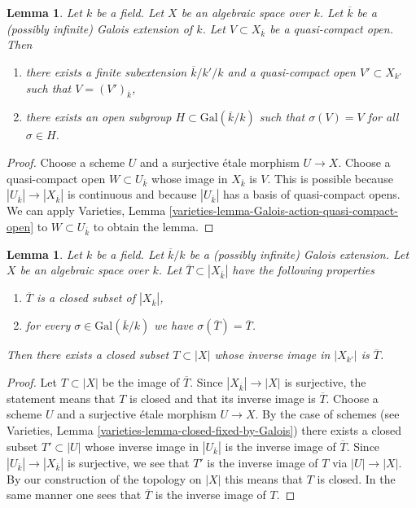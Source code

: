 \documentclass{stacks-project}
\theoremstyle{plain}
\newtheorem{lemma}[subsection]{Lemma}
\theoremstyle{definition}
\theoremstyle{remark}
\numberwithin{equation}{subsection}
\begin{document}
\begin{lemma}
\label{lemma-Galois-action-quasi-compact-open}
Let $k$ be a field. Let $X$ be an algebraic space over $k$.
Let $\overline{k}$ be a (possibly infinite) Galois extension of $k$.
Let $V \subset X_{\overline{k}}$ be a quasi-compact open.
Then
\begin{enumerate}
\item there exists a finite subextension $\overline{k}/k'/k$
and a quasi-compact open $V' \subset X_{k'}$ such that
$V = (V')_{\overline{k}}$,
\item there exists an open subgroup $H \subset \text{Gal}(\overline{k}/k)$
such that $\sigma(V) = V$ for all $\sigma \in H$.
\end{enumerate}
\end{lemma}

\begin{proof}
Choose a scheme $U$ and a surjective \'etale morphism $U \to X$.
Choose a quasi-compact open $W \subset U_{\overline{k}}$ whose
image in $X_{\overline{k}}$ is $V$. This is possible because
$|U_{\overline{k}}| \to |X_{\overline{k}}|$ is continuous and because
$|U_{\overline{k}}|$ has a basis of quasi-compact opens. We can apply
Varieties, Lemma
\ref{varieties-lemma-Galois-action-quasi-compact-open}
to $W \subset U_{\overline{k}}$ to obtain the lemma.
\end{proof}

\begin{lemma}
\label{lemma-closed-fixed-by-Galois}
Let $k$ be a field. Let $\overline{k}/k$ be a (possibly infinite)
Galois extension. Let $X$ be an algebraic space over $k$. Let
$\overline{T} \subset |X_{\overline{k}}|$ have the following properties
\begin{enumerate}
\item $\overline{T}$ is a closed subset of $|X_{\overline{k}}|$,
\item for every $\sigma \in \text{Gal}(\overline{k}/k)$
we have $\sigma(\overline{T}) = \overline{T}$.
\end{enumerate}
Then there exists a closed subset $T \subset |X|$ whose inverse image
in $|X_{k'}|$ is $\overline{T}$.
\end{lemma}

\begin{proof}
Let $T \subset |X|$ be the image of $\overline{T}$.
Since $|X_{\overline{k}}| \to |X|$ is surjective, the statement means
that $T$ is closed and that its inverse image is $\overline{T}$.
Choose a scheme $U$ and a surjective \'etale morphism $U \to X$.
By the case of schemes
(see Varieties, Lemma \ref{varieties-lemma-closed-fixed-by-Galois})
there exists a closed subset $T' \subset |U|$ whose inverse image
in $|U_{\overline{k}}|$ is the inverse image of $\overline{T}$.
Since $|U_{\overline{k}}| \to |X_{\overline{k}}|$ is surjective,
we see that $T'$ is the inverse image of $T$ via $|U| \to |X|$.
By our construction of the topology on $|X|$ this means that $T$ is
closed. In the same manner one sees that $\overline{T}$ is the inverse
image of $T$.
\end{proof}
\end{document}
